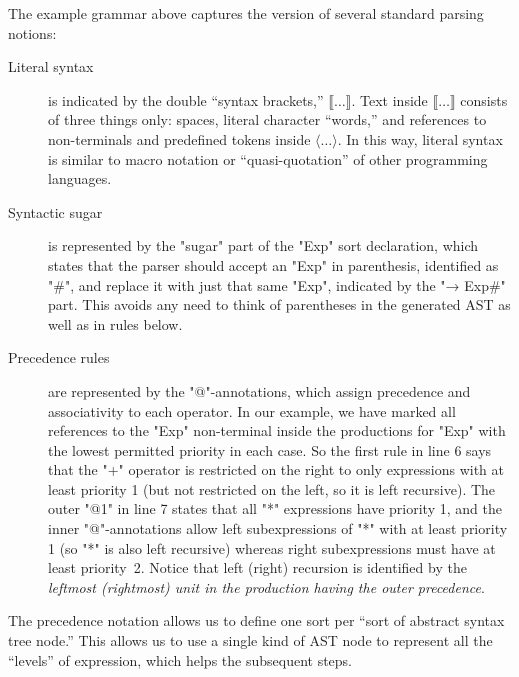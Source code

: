 \documentclass[11pt]{article} %
\begin{document}
The example grammar above captures the \HAX version of several standard parsing notions:
\begin{description}

\item[Literal syntax] is indicated by the double ``syntax brackets,'' $⟦…⟧$.  Text inside $⟦…⟧$
  consists of three things only: spaces, literal character ``words,'' and references to
  non-terminals and predefined tokens inside $⟨…⟩$.  In this way, literal syntax is similar to macro
  notation or ``quasi-quotation'' of other programming languages.

\item[Syntactic sugar] is represented by the "sugar" part of the "Exp" sort declaration, which
  states that the parser should accept an "Exp" in parenthesis, identified as "#", and replace it
  with just that same "Exp", indicated by the "→ Exp#" part.  This avoids any need to think of
  parentheses in the generated AST as well as in rules below.

\item[Precedence rules] are represented by the "@"-annotations, which assign precedence and
  associativity to each operator. In our example, we have marked all references to the "Exp"
  non-terminal inside the productions for "Exp" with the lowest permitted priority in each case. So
  the first rule in line 6 says that the "+" operator is restricted on the right to only expressions
  with at least priority 1 (but not restricted on the left, so it is left recursive). The outer "@1"
  in line 7 states that all "*" expressions have priority 1, and the inner "@"-annotations allow
  left subexpressions of "*" with at least priority 1 (so "*" is also left recursive) whereas right
  subexpressions must have at least priority~2. Notice that left (right) recursion is identified by
  the \emph{leftmost (rightmost) unit in the production having the outer precedence}.

\end{description}
The precedence notation allows us to define one sort per ``sort of abstract syntax tree node.''
This allows us to use a single kind of AST node to represent all the ``levels'' of expression, which
helps the subsequent steps.
\end{document}
